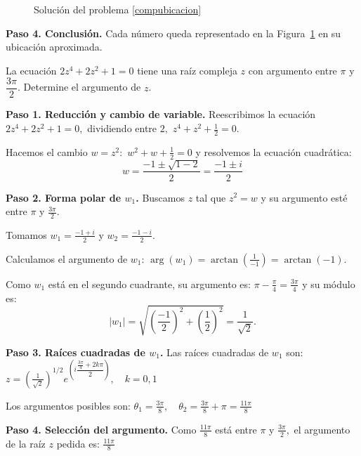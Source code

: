 \begin{prob}
\begin{myproof}
\begin{figure}[H]
\caption{Solución del problema \ref{compubicacion}}
\label{fig:compubicacion_solucion}
\end{figure}

\textbf{Paso 4. Conclusión.} Cada número queda representado en la Figura~\ref{fig:compubicacion_solucion} en su ubicación aproximada.
\end{myproof}

\end{prob}
	
\begin{prob} La ecuación $2z^4+2z^2+1=0$ tiene una raíz compleja $z$ con argumento entre $\pi$ y $\dfrac{3\pi}{2}$. Determine el argumento de $z$.
\begin{myproof}
\textbf{Paso 1. Reducción y cambio de variable.} Reescribimos la ecuación \(2z^4 + 2z^2 + 1 = 0,\) dividiendo entre $2,$ \(
z^4 + z^2 + \frac{1}{2} = 0.\)


Hacemos el cambio $w = z^2:$ \(
w^2 + w + \frac{1}{2} = 0
\) y resolvemos la ecuación cuadrática:
\[
w = \frac{-1 \pm \sqrt{1 - 2}}{2} = \frac{-1 \pm i}{2}
\]

\textbf{Paso 2. Forma polar de $w_1$.} Buscamos $z$ tal que $z^2 = w$ y su argumento esté entre $\pi$ y $\frac{3\pi}{2}$.

Tomamos $w_1 = \frac{-1 + i}{2}$ y $w_2 = \frac{-1 - i}{2}$.

Calculamos el argumento de $w_1$: \(
\arg(w_1) = \arctan\left(\frac{1}{-1}\right) = \arctan(-1).\)


Como $w_1$ está en el segundo cuadrante, su argumento es: \(\pi - \frac{\pi}{4} = \frac{3\pi}{4} \) y su módulo es: \[|w_1| = \sqrt{\left(\frac{-1}{2}\right)^2 + \left(\frac{1}{2}\right)^2} = \frac{1}{\sqrt{2}}.\]

\textbf{Paso 3. Raíces cuadradas de $w_1$.} Las raíces cuadradas de $w_1$ son: \(
z = \left(\frac{1}{\sqrt{2}}\right)^{1/2} e^{\left(i \dfrac{\frac{3\pi}{4} + 2k\pi}{2}\right)}, \quad k=0,1
\)

Los argumentos posibles son: \(
\theta_1 = \frac{3\pi}{8}, \quad \theta_2 = \frac{3\pi}{8} + \pi = \frac{11\pi}{8}
\)

\textbf{Paso 4. Selección del argumento.} Como $\frac{11\pi}{8}$ está entre $\pi$ y $\frac{3\pi}{2},$ el argumento de la raíz $z$ pedida es: \(
\boxed{\frac{11\pi}{8}}
\)
\end{myproof}

\end{prob}		

